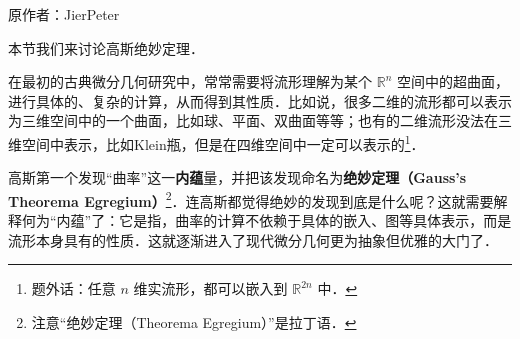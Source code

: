 
\begin{issues}
\issueDraft
\issueTODO
\end{issues}

原作者：JierPeter

本节我们来讨论高斯绝妙定理．

在最初的古典微分几何研究中，常常需要将流形理解为某个 $\mathbb{R}^n$ 空间中的超曲面，进行具体的、复杂的计算，从而得到其性质．比如说，很多二维的流形都可以表示为三维空间中的一个曲面，比如球、平面、双曲面等等；也有的二维流形没法在三维空间中表示，比如Klein瓶，但是在四维空间中一定可以表示的\footnote{题外话：任意 $n$ 维实流形，都可以嵌入到 $\mathbb{R}^{2n}$ 中．}．

高斯第一个发现“曲率”这一\textbf{内蕴}量，并把该发现命名为\textbf{绝妙定理（Gauss's Theorema Egregium）}\footnote{注意“绝妙定理（Theorema Egregium）”是拉丁语．}．连高斯都觉得绝妙的发现到底是什么呢？这就需要解释何为“内蕴”了：它是指，曲率的计算不依赖于具体的嵌入、图等具体表示，而是流形本身具有的性质．这就逐渐进入了现代微分几何更为抽象但优雅的大门了．
